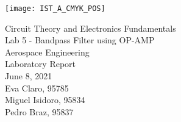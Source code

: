 
\thispagestyle {empty}

\texttt{[image: IST\_A\_CMYK\_POS]}

\begin{center}
%
\vspace{1.0cm}

\vspace{2cm}
{\FontLb Circuit Theory and Electronics Fundamentals} \\ %
\vspace{1cm}
{\FontLb Lab 5 - Bandpass Filter using OP-AMP} \\ %
\vspace{1cm}
{\FontLb Aerospace Engineering} \\ %
\vspace{4cm}
{\FontSn Laboratory Report} \\
\vspace{0.5cm}
{\FontSn June 8, 2021} \\ %
\vspace{7cm}
{\FontSn Eva Claro, 95785} \\
\vspace{0.5cm}
{\FontSn Miguel Isidoro, 95834} \\
\vspace{0.5cm}
{\FontSn Pedro Braz, 95837} \\
\newpage
%
\end{center}
